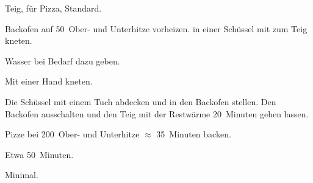\begin{recipe}{Teig, für Pizza, Standard.}
	\item[Vorbereitung] Backofen auf 50\textcelsius~Ober- und Unterhitze vorheizen.
	 in einer Schüssel mit
	 zum Teig kneten. 
	\item[Tipp] Wasser bei Bedarf dazu geben. 
	\item[Tipp] Mit einer Hand kneten.
	\item[Gehen lassen] Die Schüssel mit einem Tuch abdecken und in den Backofen stellen. Den Backofen ausschalten und den Teig mit der Restwärme 20~Minuten gehen lassen.
	\item[Pizza machen]
	\item[Backen] Pizze bei 200\textcelsius~Ober- und Unterhitze $\approx$ 35~Minuten backen.
	\item[Zubereitungszeit] Etwa 50~Minuten.
	\item[Abwaschaufwand] Minimal.
\end{recipe}